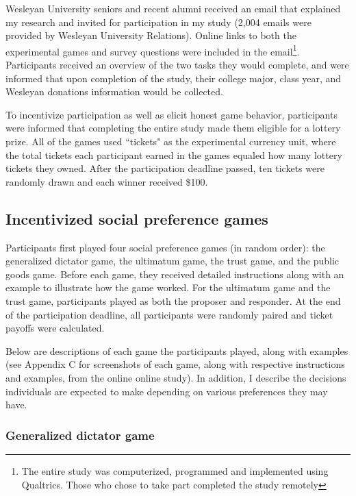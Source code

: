 \documentclass[12pt]{article}
\begin{document}
Wesleyan University seniors and recent alumni received an email that explained my research and invited for participation in my study (2,004 emails were provided by Wesleyan University Relations). Online links to both the experimental games and survey questions were included in the email\footnote{The entire study was computerized, programmed and implemented using Qualtrics. Those who chose to take part completed the study remotely}. Participants received an overview of the two tasks they would complete, and were informed that upon completion of the study, their college major, class year, and Wesleyan donations information would be collected.

To incentivize participation as well as elicit honest game behavior, participants were informed that completing the entire study made them eligible for a lottery prize. All of the games used ``tickets" as the experimental currency unit, where the total tickets each participant earned in the games equaled how many lottery tickets they owned. After the participation deadline passed, ten tickets were randomly drawn and each winner received \$100.


\subsection{Incentivized social preference games}


Participants first played four social preference games (in random order): the generalized dictator game, the ultimatum game, the trust game, and the public goods game. Before each game, they received detailed instructions along with an example to illustrate how the game worked. For the ultimatum game and the trust game, participants played as both the proposer and responder. At the end of the participation deadline, all participants were randomly paired and ticket payoffs were calculated.

Below are descriptions of each game the participants played, along with examples (see Appendix C for screenshots of each game, along with respective instructions and examples, from the online online study). In addition, I describe the decisions individuals are expected to make depending on various preferences they may have.

\subsubsection{Generalized dictator game}
\end{document}
